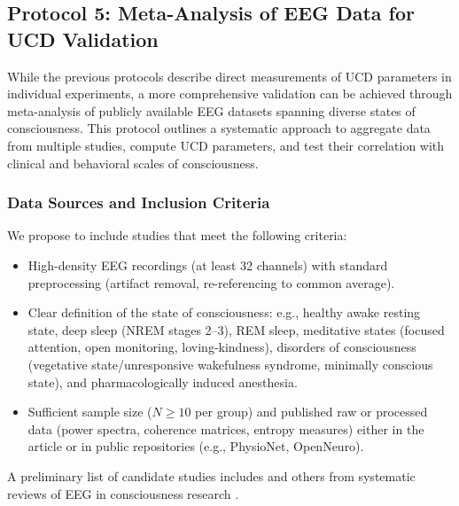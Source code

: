 \documentclass[12pt,a4paper]{article}
\begin{document}
	\subsection{Protocol 5: Meta-Analysis of EEG Data for UCD Validation}
	\label{sec:protocol5}
	
	While the previous protocols describe direct measurements of UCD parameters in individual experiments, a more comprehensive validation can be achieved through meta-analysis of publicly available EEG datasets spanning diverse states of consciousness. This protocol outlines a systematic approach to aggregate data from multiple studies, compute UCD parameters, and test their correlation with clinical and behavioral scales of consciousness.
	
	\subsubsection{Data Sources and Inclusion Criteria}
	We propose to include studies that meet the following criteria:
	\begin{itemize}
		\item High-density EEG recordings (at least 32 channels) with standard preprocessing (artifact removal, re-referencing to common average).
		\item Clear definition of the state of consciousness: e.g., healthy awake resting state, deep sleep (NREM stages 2–3), REM sleep, meditative states (focused attention, open monitoring, loving-kindness), disorders of consciousness (vegetative state/unresponsive wakefulness syndrome, minimally conscious state), and pharmacologically induced anesthesia.
		\item Sufficient sample size (\(N \geq 10\) per group) and published raw or processed data (power spectra, coherence matrices, entropy measures) either in the article or in public repositories (e.g., PhysioNet, OpenNeuro).
	\end{itemize}
	A preliminary list of candidate studies includes \cite{Diaz2025, Galindo2025, Charsouei2025, Treves2024, Gu2025} and others from systematic reviews of EEG in consciousness research \cite{Laureys2005, Demertzi2019}.
	
\end{document}
